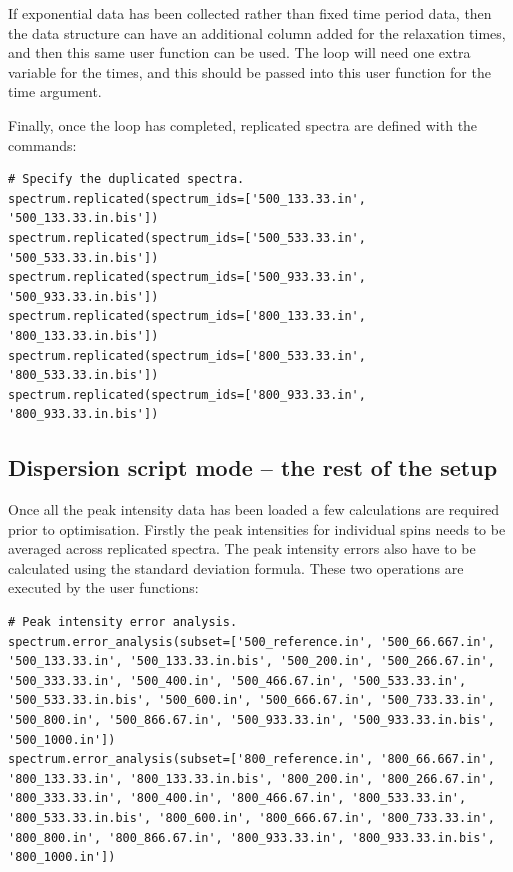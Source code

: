 If exponential data has been collected rather than fixed time period data, then the  data structure can have an additional column added for the relaxation times, and then this same user function can be used.
The  loop will need one extra variable for the times, and this should be passed into this  user function for the time argument.

Finally, once the  loop has completed, replicated spectra are defined with the commands:

\begin{lstlisting}[firstnumber=111]
# Specify the duplicated spectra.
spectrum.replicated(spectrum_ids=['500_133.33.in', '500_133.33.in.bis'])
spectrum.replicated(spectrum_ids=['500_533.33.in', '500_533.33.in.bis'])
spectrum.replicated(spectrum_ids=['500_933.33.in', '500_933.33.in.bis'])
spectrum.replicated(spectrum_ids=['800_133.33.in', '800_133.33.in.bis'])
spectrum.replicated(spectrum_ids=['800_533.33.in', '800_533.33.in.bis'])
spectrum.replicated(spectrum_ids=['800_933.33.in', '800_933.33.in.bis'])
\end{lstlisting}



\subsection{Dispersion script mode -- the rest of the setup} \label{sect: dispersion setup fin}

Once all the peak intensity data has been loaded a few calculations are required prior to optimisation.
Firstly the peak intensities for individual spins needs to be averaged across replicated spectra.
The peak intensity errors also have to be calculated using the standard deviation formula.
These two operations are executed by the user functions:

\begin{lstlisting}[firstnumber=119]
# Peak intensity error analysis.
spectrum.error_analysis(subset=['500_reference.in', '500_66.667.in', '500_133.33.in', '500_133.33.in.bis', '500_200.in', '500_266.67.in', '500_333.33.in', '500_400.in', '500_466.67.in', '500_533.33.in', '500_533.33.in.bis', '500_600.in', '500_666.67.in', '500_733.33.in', '500_800.in', '500_866.67.in', '500_933.33.in', '500_933.33.in.bis', '500_1000.in'])
spectrum.error_analysis(subset=['800_reference.in', '800_66.667.in', '800_133.33.in', '800_133.33.in.bis', '800_200.in', '800_266.67.in', '800_333.33.in', '800_400.in', '800_466.67.in', '800_533.33.in', '800_533.33.in.bis', '800_600.in', '800_666.67.in', '800_733.33.in', '800_800.in', '800_866.67.in', '800_933.33.in', '800_933.33.in.bis', '800_1000.in'])
\end{lstlisting}

